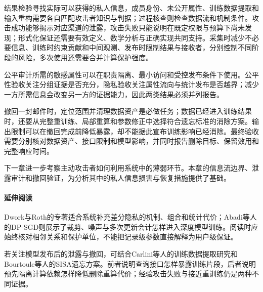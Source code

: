 结果检验寻找实际可以获得的私人信息，成员身份、未公开属性、训练数据提取和输入重构需要各自匹配攻击者知识与判据；过程核查则检查数据流和机制条件。攻击成功能够揭示对应渠道的泄露，攻击失败只能说明在既定权限与预算下尚未发现；形式化保证还需要有效定义、数学分析与正确实现共同支持。采集时减少不必要信息、训练时约束贡献和中间观测、发布时限制结果与接收者，分别控制不同阶段的风险，多次使用还需要合并计算保护强度。

公平审计所需的敏感属性可以在职责隔离、最小访问和受控发布条件下使用。公平性验收关注分组证据是否充分，隐私验收关注属性流向与统计发布是否越界；减少一方所需信息会改变另一方的证据能力，因此两类结果必须并列报告。

撤回一封邮件时，定位范围并清理数据资产是必做任务；数据已经进入训练结果时，还要从完整重训练、局部重算和参数修正中选择符合遗忘标准的消除方案。输出限制可以在撤回完成前降低暴露，却不能据此宣布训练影响已经消除。最终验收需要分别核对数据资产、接口限制和模型影响，并同时报告删除目标、保留效用和完整响应时间。

下一章进一步考察主动攻击者如何利用系统中的薄弱环节。本章的信息流边界、泄露审计和撤回验证，为分析其中的私人信息损害与恢复措施提供了基础。

\paragraph{延伸阅读}

Dwork与Roth的专著适合系统补充差分隐私的机制、组合和统计代价；Abadi等人的DP-SGD则展示了裁剪、噪声与多次更新会计怎样进入深度模型训练。阅读时应始终核对相邻关系和保护单位，不能把记录级参数直接解释为用户级保证。

若关注模型发布后的泄露与撤回，可结合Carlini等人的训练数据提取研究和Bourtoule等人的SISA遗忘方案。前者说明查询接口怎样暴露训练片段，后者说明预先隔离计算依赖怎样降低删除重算代价；经验攻击失败与接近重训练仍是两种不同证据。
